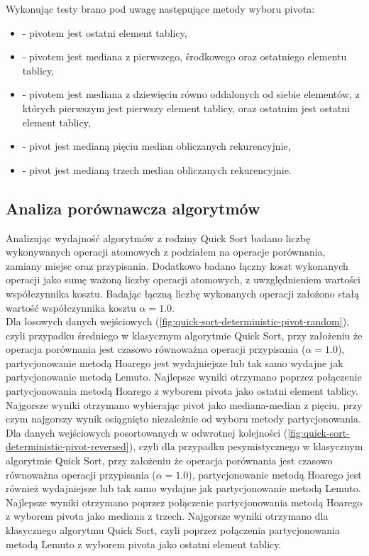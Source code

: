 Wykonując testy brano pod uwagę następujące metody wyboru pivota:
\begin{itemize}
	\setlength\itemsep{0em}
	\item {} - pivotem jest ostatni element tablicy,
	\item {} - pivotem jest mediana z pierwszego, środkowego oraz ostatniego elementu tablicy,
	\item {} - pivotem jest mediana z dziewięciu równo oddalonych od siebie elementów, z których pierwszym jest pierwszy element tablicy, oraz ostatnim jest ostatni element tablicy,
	\item {} - pivot jest medianą pięciu median obliczanych rekurencyjnie,
	\item {} - pivot jest medianą trzech median obliczanych rekurencyjnie.\\
\end{itemize}

\subsection{Analiza porównawcza algorytmów}

Analizując wydajność algorytmów z rodziny Quick Sort badano liczbę wykonywanych operacji atomowych z podziałem na operacje porównania, zamiany miejsc oraz przypisania. Dodatkowo badano łączny koszt wykonanych operacji jako sumę ważoną liczby operacji atomowych, z uwzględnieniem wartości współczynnika kosztu. Badając łączną liczbę wykonanych operacji założono stałą wartość współczynnika kosztu $\alpha = 1.0$.\\

Dla losowych danych wejściowych (\ref{fig:quick-sort-deterministic-pivot-random}), czyli przypadku średniego w klasycznym algorytmie Quick Sort, przy założeniu że operacja porównania jest czasowo równoważna operacji przypisania ($\alpha=1.0$), partycjonowanie metodą Hoarego jest wydajniejsze lub tak samo wydajne jak partycjonowanie metodą Lemuto. Najlepsze wyniki otrzymano poprzez połączenie partycjonowania metodą Hoarego z wyborem pivota jako ostatni element tablicy. Najgorsze wyniki otrzymano wybierając pivot jako mediana-median z pięciu, przy czym najgorszy wynik osiągnięto niezależnie od wyboru metody partycjonowania.\\

Dla danych wejściowych posortowanych w odwrotnej kolejności (\ref{fig:quick-sort-deterministic-pivot-reversed}), czyli dla przypadku pesymistycznego w klasycznym algorytmie Quick Sort, przy założeniu że operacja porównania jest czasowo równoważna operacji przypisania ($\alpha=1.0$), partycjonowanie metodą Hoarego jest również wydajniejsze lub tak samo wydajne jak partycjonowanie metodą Lemuto. Najlepsze wyniki otrzymano poprzez połączenie partycjonowania metodą Hoarego z wyborem pivota jako mediana z trzech. Najgorsze wyniki otrzymano dla klasycznego algorytmu Quick Sort, czyli poprzez połączenia partycjonowania metodą Lemuto z wyborem pivota jako ostatni element tablicy.\\


